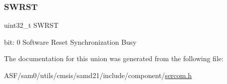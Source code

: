 \subsubsection{\texorpdfstring{SWRST}{SWRST}}
{\footnotesize\ttfamily uint32\+\_\+t S\+W\+R\+ST}

bit\+: 0 Software Reset Synchronization Busy 

The documentation for this union was generated from the following file\+:\begin{DoxyCompactItemize}
\item 
A\+S\+F/sam0/utils/cmsis/samd21/include/component/\mbox{\hyperlink{utils_2cmsis_2samd21_2include_2component_2sercom_8h}{sercom.\+h}}\end{DoxyCompactItemize}

